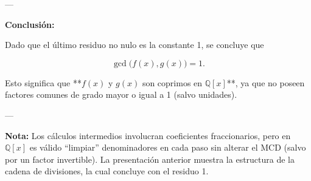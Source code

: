 ---

\textbf{Conclusión:}

Dado que el último residuo no nulo es la constante 1, se concluye que

\[
\boxed{\gcd\bigl(f(x),g(x)\bigr)= 1.}
\]

Esto significa que **\(f(x)\) y \(g(x)\) son coprimos en \(\mathbb{Q}[x]\)**, ya que no poseen factores comunes de grado mayor o igual a 1 (salvo unidades).

---

\textbf{Nota:}  Los cálculos intermedios involucran coeficientes fraccionarios, pero en \(\mathbb{Q}[x]\) es válido “limpiar” denominadores en cada paso sin alterar el MCD (salvo por un factor invertible). La presentación anterior muestra la estructura de la cadena de divisiones, la cual concluye con el residuo 1.
